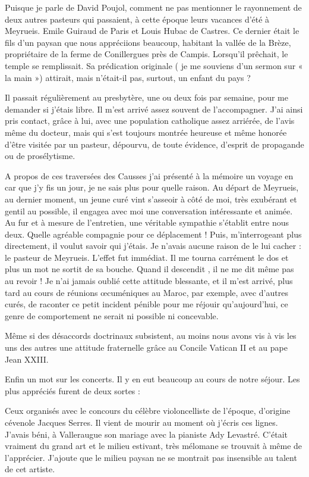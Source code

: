 Puisque je parle de David Poujol, comment ne pas mentionner le rayonnement de
deux autres pasteurs qui passaient, à cette époque leurs vacances d’été à Meyrueis.
Emile Guiraud de Paris et Louis Hubac de Castres. Ce dernier était le fils d’un paysan
que nous appréciions beaucoup, habitant la vallée de la Brèze, propriétaire de la
ferme de Conillergues près de Campis. Lorsqu’il prêchait, le temple se remplissait.
Sa prédication originale ( je me souviens d’un sermon sur « la main ») attirait, mais
n’était-il pas, surtout, un enfant du pays ?

Il passait régulièrement au presbytère, une ou deux fois par semaine, pour me
demander si j’étais libre. Il m’est arrivé assez souvent de l’accompagner. J’ai ainsi
pris contact, grâce à lui, avec une population catholique assez arriérée, de l’avis
même du docteur, mais qui s’est toujours montrée heureuse et même honorée d’être
visitée par un pasteur, dépourvu, de toute évidence, d’esprit de propagande ou de
prosélytisme.

A propos de ces traversées des Causses j’ai présenté à la mémoire un voyage en car
que j’y fis un jour, je ne sais plus pour quelle raison. Au départ de Meyrueis, au
dernier moment, un jeune curé vint s’asseoir à côté de moi, très exubérant et gentil
au possible, il engagea avec moi une conversation intéressante et animée. Au fur et à
mesure de l’entretien, une véritable sympathie s’établit entre nous deux. Quelle
agréable compagnie pour ce déplacement ! Puis, m’interrogeant plus directement, il
voulut savoir qui j’étais. Je n’avais aucune raison de le lui cacher : le pasteur de
Meyrueis. L’effet fut immédiat. Il me tourna carrément le dos et plus un mot ne sortit
de sa bouche. Quand il descendit , il ne me dit même pas au revoir !
Je n’ai jamais oublié cette attitude blessante, et il m’est arrivé, plus tard au cours de
réunions œcuméniques au Maroc, par exemple, avec d’autres curés, de raconter ce
petit incident pénible pour me réjouir qu’aujourd’hui, ce genre de comportement ne
serait ni possible ni concevable.

Même si des désaccords doctrinaux subsistent, au moins nous avons vis à vis les uns
des autres une attitude fraternelle grâce au Concile Vatican II et au pape Jean XXIII.

Enfin un mot sur les concerts. Il y en eut beaucoup au cours de notre séjour. Les plus
appréciés furent de deux sortes :

Ceux organisés avec le concours du célèbre violoncelliste de l’époque, d’origine
cévenole Jacques Serres. Il vient de mourir au moment où j’écris ces lignes. J’avais
béni, à Valleraugue son mariage avec la pianiste Ady Levastré. C’était vraiment du
grand art et le milieu estivant, très mélomane se trouvait à même de l’apprécier.
J’ajoute que le milieu paysan ne se montrait pas insensible au talent de cet artiste.

